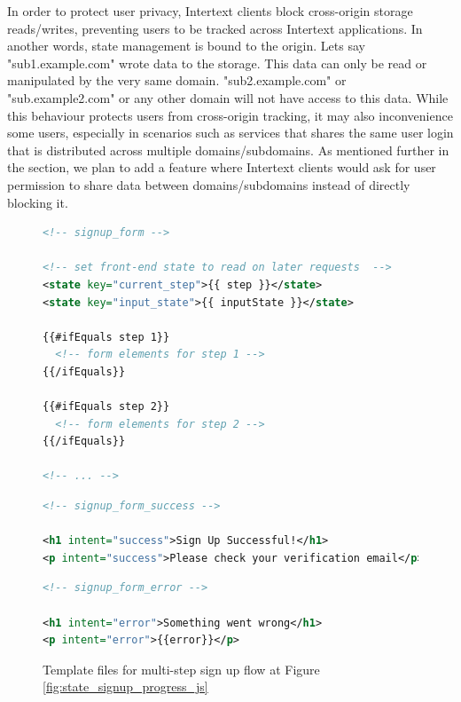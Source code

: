 In order to protect user privacy, Intertext clients block cross-origin storage reads/writes, preventing users to be tracked across Intertext applications. In another words, state management is bound to the origin. Lets say "sub1.example.com" wrote data to the storage. This data can only be read or manipulated by the very same domain. "sub2.example.com" or "sub.example2.com" or any other domain will not have access to this data. While this behaviour protects users from cross-origin tracking, it may also inconvenience some users, especially in scenarios such as services that shares the same user login that is distributed across multiple domains/subdomains. As mentioned further in the  section, we plan to add a feature where Intertext clients would ask for user permission to share data between domains/subdomains instead of directly blocking it.

\begin{figure}
\begin{minipage}{\linewidth}
\begin{lstlisting}[language=xml]
<!-- signup_form -->

<!-- set front-end state to read on later requests  -->
<state key="current_step">{{ step }}</state>
<state key="input_state">{{ inputState }}</state>

{{#ifEquals step 1}}
  <!-- form elements for step 1 -->
{{/ifEquals}}

{{#ifEquals step 2}}
  <!-- form elements for step 2 -->
{{/ifEquals}}

<!-- ... -->
\end{lstlisting}

\begin{lstlisting}[language=xml]
<!-- signup_form_success -->

<h1 intent="success">Sign Up Successful!</h1>
<p intent="success">Please check your verification email</p>
\end{lstlisting}

\begin{lstlisting}[language=xml]
<!-- signup_form_error -->

<h1 intent="error">Something went wrong</h1>
<p intent="error">{{error}}</p>
\end{lstlisting}

\end{minipage}
\caption{Template files for multi-step sign up flow at Figure \ref{fig:state_signup_progress_js}}%
\label{fig:state_signup_progress_xml}%
\end{figure}
